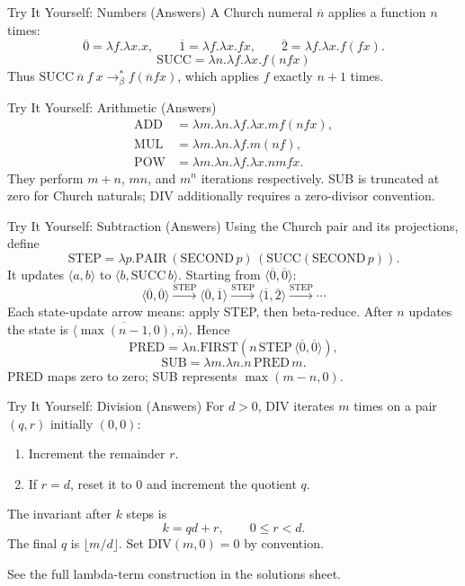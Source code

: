 \documentclass{beamer}
\begin{document}
\begin{frame}{Try It Yourself: Numbers (Answers)}
  A Church numeral $\overline n$ applies a function $n$ times:
  \[\overline0=\lambda f.\lambda x.x,\qquad
    \overline1=\lambda f.\lambda x.f x,\qquad
    \overline2=\lambda f.\lambda x.f(f x).\]
  \[\mathrm{SUCC}=\lambda n.\lambda f.\lambda x.f(n f x)\]
  Thus $\mathrm{SUCC}\ \overline n\ f\ x\to_\beta^* f(\overline n f x)$, which applies $f$ exactly $n+1$ times.
\end{frame}
\begin{frame}{Try It Yourself: Arithmetic (Answers)}
  \small
  \begin{align*}
    \mathrm{ADD}&=\lambda m.\lambda n.\lambda f.\lambda x.m f(n f x),\\
    \mathrm{MUL}&=\lambda m.\lambda n.\lambda f.m(n f),\\
    \mathrm{POW}&=\lambda m.\lambda n.\lambda f.\lambda x.n m f x.
  \end{align*}
  They perform $m+n$, $mn$, and $m^n$ iterations respectively. SUB is truncated at zero for Church naturals; DIV additionally requires a zero-divisor convention.
\end{frame}
\begin{frame}{Try It Yourself: Subtraction (Answers)}
  \small
  Using the Church pair and its projections, define
  \[\mathrm{STEP}=\lambda p.\mathrm{PAIR}\,(\mathrm{SECOND}\,p)\,
    (\mathrm{SUCC}(\mathrm{SECOND}\,p)).\]
  It updates $\langle a,b\rangle$ to $\langle b,\mathrm{SUCC}\,b\rangle$.
  Starting from $\langle\overline0,\overline0\rangle$:
  \[\langle\overline0,\overline0\rangle\xrightarrow{\mathrm{STEP}}
    \langle\overline0,\overline1\rangle\xrightarrow{\mathrm{STEP}}
    \langle\overline1,\overline2\rangle\xrightarrow{\mathrm{STEP}}\cdots\]
  Each state-update arrow means: apply STEP, then beta-reduce.
  After $n$ updates the state is
  $\langle\overline{\max(n-1,0)},\overline n\rangle$. Hence
  \[\mathrm{PRED}=\lambda n.\mathrm{FIRST}
    (n\,\mathrm{STEP}\,\langle\overline0,\overline0\rangle),\]
  \[\mathrm{SUB}=\lambda m.\lambda n.n\,\mathrm{PRED}\,m.\]
  PRED maps zero to zero; SUB represents $\max(m-n,0)$.
\end{frame}
\begin{frame}{Try It Yourself: Division (Answers)}
  For $d>0$, DIV iterates $m$ times on a pair $(q,r)$ initially $(0,0)$:
  \begin{enumerate}
    \item Increment the remainder $r$.
    \item If $r=d$, reset it to $0$ and increment the quotient $q$.
  \end{enumerate}
  The invariant after $k$ steps is
  \[k=qd+r,\qquad 0\le r<d.\]
  The final $q$ is $\lfloor m/d\rfloor$. Set DIV$(m,0)=0$ by convention.

  See the full lambda-term construction in the solutions sheet.
\end{frame}
\end{document}
